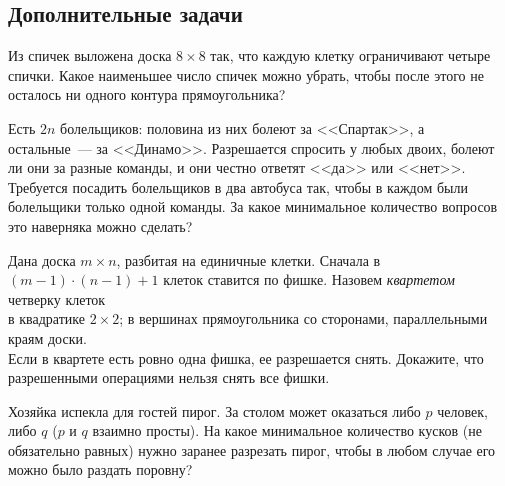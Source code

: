 

\subsection*{Дополнительные задачи}



\begin{problems}

\item
Из спичек выложена доска $8 \times 8$ так, что каждую клетку ограничивают
четыре спички.
Какое наименьшее число спичек можно убрать, чтобы после этого не осталось
ни одного контура прямоугольника?

\item
Есть $2 n$ болельщиков: половина из них болеют за <<Спартак>>, а остальные~---
за <<Динамо>>.
Разрешается спросить у любых двоих, болеют ли они за разные команды, и они
честно ответят <<да>> или <<нет>>.
Требуется посадить болельщиков в два автобуса так, чтобы в каждом были
болельщики только одной команды.
За какое минимальное количество вопросов это наверняка можно сделать?

\item
Дана доска $m \times n$, разбитая на единичные клетки.
Сначала в $(m - 1) \cdot (n - 1) + 1$ клеток ставится по фишке.
Назовем \emph{квартетом} четверку клеток
\\
\sp в квадратике $2 \times 2$;
\qquad
\sp в вершинах прямоугольника со сторонами, параллельными краям доски.
\\
Если в квартете есть ровно одна фишка, ее разрешается снять.
Докажите, что разрешенными операциями нельзя снять все фишки.

\item
Хозяйка испекла для гостей пирог.
За столом может оказаться либо $p$ человек, либо $q$
($p$ и $q$ взаимно просты).
На какое минимальное количество кусков (не обязательно равных) нужно заранее
разрезать пирог, чтобы в любом случае его можно было раздать поровну?

\end{problems}

